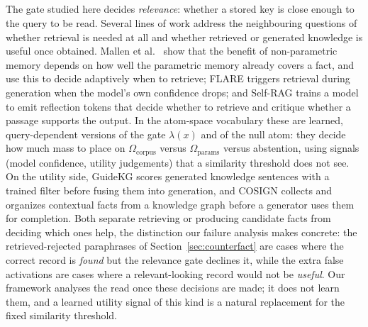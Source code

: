 \documentclass[preprint,12pt]{elsarticle}
\newcommand{\Om}{\Omega}
\newif\ifmarkchanges %
\newcommand{\rev}[1]{\ifmarkchanges{\color{blue}#1}\else#1\fi} %
\providecommand{\DIFaddtex}[1]{{\protect\color{blue}\uwave{#1}}} %
\providecommand{\DIFaddbegin}{} %
\providecommand{\DIFadd}[1]{\texorpdfstring{\DIFaddtex{#1}}{#1}} %
\providecommand{\DIFaddincludegraphics}[2][]{{\color{blue}\fbox{\DIFOincludegraphics[#1]{#2}}}} %
\DeclareRobustCommand{\DIFaddbegin}{\DIFOaddbegin \let\includegraphics\DIFaddincludegraphics} %
\begin{document}
\DIFaddbegin \subsection{\DIFadd{Relevance, Utility, and When to Retrieve}}
\rev{The gate studied here decides \emph{relevance}: whether a stored key is close enough to the query to be read. Several lines of work address the neighbouring questions of whether retrieval is needed at all and whether retrieved or generated knowledge is useful once obtained. Mallen et al.\ \cite{mallen2023trust} show that the benefit of non-parametric memory depends on how well the parametric memory already covers a fact, and use this to decide adaptively when to retrieve; FLARE \cite{jiang2023active} triggers retrieval during generation when the model's own confidence drops; and Self-RAG \cite{asai2024selfrag} trains a model to emit reflection tokens that decide whether to retrieve and critique whether a passage supports the output. In the atom-space vocabulary these are learned, query-dependent versions of the gate $\lambda(x)$ and of the null atom: they decide how much mass to place on $\Om_{\mathrm{corpus}}$ versus $\Om_{\mathrm{params}}$ versus abstention, using signals (model confidence, utility judgements) that a similarity threshold does not see. On the utility side, GuideKG \cite{wei2024guidekg} scores generated knowledge sentences with a trained filter before fusing them into generation, and COSIGN \cite{li2024cosign} collects and organizes contextual facts from a knowledge graph before a generator uses them for completion. Both separate retrieving or producing candidate facts from deciding which ones help, the distinction our failure analysis makes concrete: the retrieved-rejected paraphrases of Section~\ref{sec:counterfact} are cases where the correct record is \emph{found} but the relevance gate declines it, while the extra false activations are cases where a relevant-looking record would not be \emph{useful}. Our framework analyses the read once these decisions are made; it does not learn them, and a learned utility signal of this kind is a natural replacement for the fixed similarity threshold.}
\end{document}
